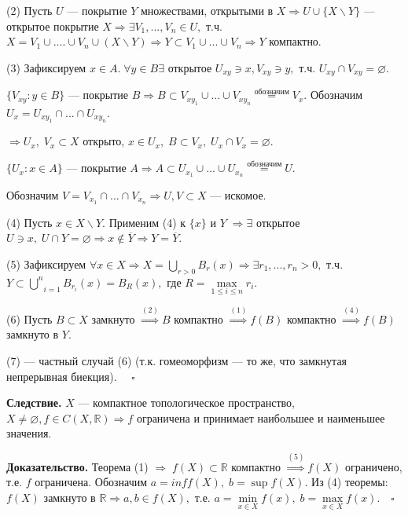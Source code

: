 \documentclass[12pt,a4paper]{article}
\begin{document}
(2) Пусть $U$ --- покрытие $Y$ множествами, открытыми в $X \Rightarrow U \cup \{X \backslash Y\}$ --- открытое покрытие $X \Rightarrow \exists V_{1}, ..., V_{n} \in U,$ т.ч. $X = V_{1} \cup .... \cup V_{n} \cup (X \backslash Y) \Rightarrow Y \subset V_{1} \cup ... \cup V_{n} \Rightarrow Y$ компактно. 

(3) Зафиксируем $x \in A. \; \forall y \in B \exists$ открытое $U_{xy} \ni x, V_{xy} \ni y,$ т.ч. $U_{xy} \cap V_{xy} = \varnothing.$

$\{V_{xy}\!: y \in B\}$ --- покрытие $B \Rightarrow B \subset V_{xy_{1}} \cup ... \cup V_{xy_{n}} \overset{\text{обозначим}}{=} V_{x}.$ Обозначим $U_{x} = U_{xy_{1}} \cap ... \cap U_{xy_{n}}.$

$\Rightarrow U_{x}, \; V_{x} \subset X$ открыто, $x \in U_{x}, \; B \subset V_{x}, \; U_{x} \cap V_{x} = \varnothing.$

$\{U_{x}\!: x \in A\}$ --- покрытие $A \Rightarrow A \subset U_{x_{1}} \cup ... \cup U_{x_{n}} \overset{\text{обозначим}}{=} U.$ 

Обозначим $V = V_{x_{1}} \cap ... \cap V_{x_{n}} \Rightarrow U, V \subset X$ --- искомое. 

(4) Пусть $x \in X \backslash Y.$ Применим (4) к $\{x\}$ и $Y \; \Rightarrow \exists$ открытое $U \ni x, \; U \cap Y = \varnothing \Rightarrow x \not \in \overline{Y} \Rightarrow Y = \overline{Y}.$

(5) Зафиксируем $\forall x \in X \Rightarrow X = \underset{r > 0}{\bigcup} B_{r}(x) \Rightarrow \exists r_{1}, ..., r_{n} > 0,$ т.ч. $Y \subset \underset{i = 1}{\overset{n}{\bigcup}} B_{r_{i}}(x) = B_{R}(x),$ где $R = \underset{1 \leq i \leq n}{\max} r_{i}.$ 

(6) Пусть $B \subset X$ замкнуто $\overset{(2)}{\Rightarrow} B$ компактно $\overset{(1)}{\Rightarrow} f(B)$ компактно $\overset{(4)}{\Rightarrow} f(B)$ замкнуто в $Y.$ 

(7) --- частный случай (6) (т.к. гомеоморфизм --- то же, что замкнутая непрерывная биекция). $\quad \square$ 

\textbf{Следствие.} $X$ --- компактное топологическое пространство, $X \neq \varnothing, f \in C(X, \mathbb{R}) \Rightarrow f$ ограничена и принимает наибольшее и наименьшее значения. 

\textbf{Доказательство.} Теорема (1) $\Rightarrow \; f(X) \subset \mathbb{R}$ компактно $\overset{(5)}{\Rightarrow} f(X)$ ограничено, т.е. $f$ ограничена. Обозначим $a = inf f(X), \; b = \sup f(X).$ Из (4) теоремы: $f(X)$ замкнуто в $\mathbb{R} \Rightarrow a, b \in f(X),$ т.е. $a = \underset{x \in X}{\min} f(x), \; b = \underset{x \in X}{\max} f(x). \quad \square$
\end{document}

